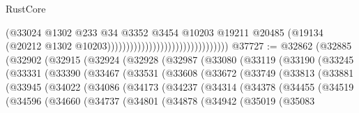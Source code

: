 \begin{lexlean}{RustCore}
\begin{coremodule}
                                                              (@33024
                                                                @1302
                                                                @233
                                                                @34
                                                                @3352
                                                                @3454
                                                                @10203
                                                                @19211
                                                                @20485
                                                                (@19134
                                                                  (@20212
                                                                    @1302
                                                                    @10203))))))))))))))))))))))))))))))))
@37727 := @32862
    (@32885
      (@32902
        (@32915
          (@32924
            (@32928
              (@32987
                (@33080
                  (@33119
                    (@33190
                      (@33245
                        (@33331
                          (@33390
                            (@33467
                              (@33531
                                (@33608
                                  (@33672
                                    (@33749
                                      (@33813
                                        (@33881
                                          (@33945
                                            (@34022
                                              (@34086
                                                (@34173
                                                  (@34237
                                                    (@34314
                                                      (@34378
                                                        (@34455
                                                          (@34519
                                                            (@34596
                                                              (@34660
                                                                (@34737
                                                                  (@34801
                                                                    (@34878
                                                                      (@34942
                                                                        (@35019
                                                                          (@35083

\end{coremodule}
\end{lexlean}
